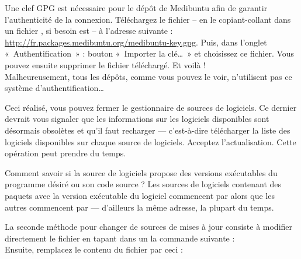 {Une clef GPG est nécessaire pour le dépôt de Medibuntu afin de garantir l'authenticité de la connexion. Téléchargez le fichier  -- en le copiant-collant dans un fichier , si besoin est -- à l'adresse suivante : \url{http://fr.packages.medibuntu.org/medibuntu-key.gpg}. Puis, dans l'onglet «~Authentification~» : bouton «~Importer la clé\ldots{}~» et choisissez ce fichier. Vous pouvez ensuite supprimer le fichier téléchargé. Et voilà !\\
Malheureusement, tous les dépôts, comme vous pouvez le voir, n'utilisent pas ce système d'authentification\ldots{}\par
Ceci réalisé, vous pouvez fermer le gestionnaire de sources de logiciels. Ce dernier devrait vous signaler que les informations sur les logiciels disponibles sont désormais obsolètes et qu'il faut recharger --- c'est-à-dire télécharger la liste des logiciels disponibles sur chaque source de logiciels. Acceptez l'actualisation. Cette opération peut prendre du temps.\par
\begin{nota}
Comment savoir si la source de logiciels propose des versions exécutables du programme désiré ou son code source ? Les sources de logiciels contenant des paquets avec la version exécutable du logiciel commencent par  alors que les autres commencent par  --- d'ailleurs la même adresse, la plupart du temps.
\end{nota}
La seconde méthode pour changer de sources de mises à jour consiste à modifier directement le fichier  en tapant dans un  la commande suivante : \\
Ensuite, remplacez le contenu du fichier par ceci :\\
}
